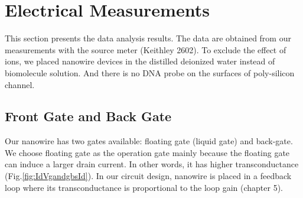 \section{Electrical Measurements}
This section presents the data analysis results.
The data are obtained from our measurements with the source meter (Keithley 2602).
To exclude the effect of ions, we placed nanowire devices in the distilled deionized water instead of biomolecule solution.
And there is no DNA probe on the surfaces of poly-silicon channel.

\subsection{Front Gate and Back Gate}
Our nanowire has two gates available: floating gate (liquid gate) and back-gate.
We choose floating gate as the operation gate mainly because the floating gate can induce a larger drain current.
In other words, it has higher transconductance (Fig.\ref{fig:IdVgandgbsId}).
In our circuit design, nanowire is placed in a feedback loop where its transconductance is proportional to the loop gain (chapter 5).

